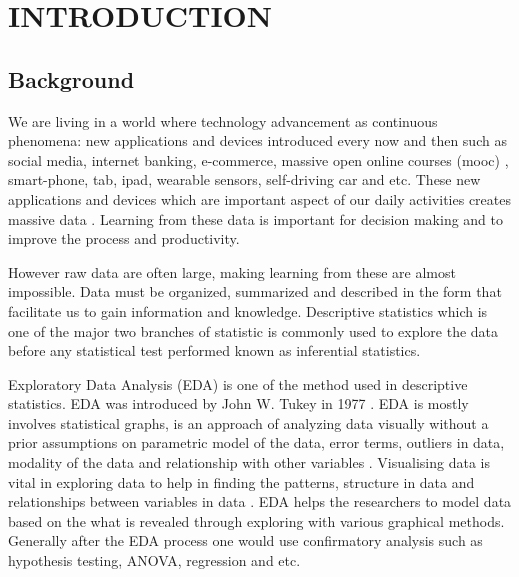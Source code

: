\chapter{\textbf{INTRODUCTION}}\label{Introchap} 

\section{Background}

We are living in a world where technology advancement as continuous phenomena: new applications and devices introduced every now and then such as social media, internet banking, e-commerce, massive open online courses (mooc) , smart-phone, tab, ipad, wearable sensors, self-driving car and etc. These new applications and devices which are important aspect of our daily activities creates massive data \cite[]{torrecilla2018data}. Learning from these data is important for decision making and to improve the process and productivity. 

However raw data are often large, making learning from these are almost impossible. Data must be organized, summarized and described in the form that facilitate us to gain information and knowledge. Descriptive statistics which is one of the major two branches of statistic is commonly used to explore the data before any statistical test performed known as inferential statistics. 

Exploratory Data Analysis (EDA) is one of the method used in descriptive statistics. EDA was introduced by John W. Tukey in 1977 \cite[]{wendy2002computational}. EDA is mostly involves statistical graphs, is an approach of analyzing data visually without a prior assumptions on parametric model of the data, error terms, outliers in data, modality of the data and relationship with other variables \cite[]{velleman1981applications,wendy2002computational}. Visualising data is vital in exploring data \cite[]{scott2005multidimensional} to help in finding the  patterns, structure in data and relationships between variables in data \cite[]{hand2001principles}. EDA helps the researchers to model data based on the what is revealed through exploring with various graphical methods. Generally after the EDA process one would use confirmatory analysis such as hypothesis testing, ANOVA, regression and etc.

